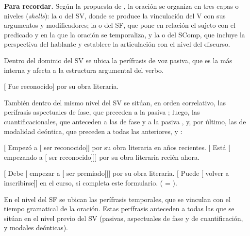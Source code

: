 \begin{destacado}
\textbf{Para recordar.} Según la propuesta de \textcite{rizzi1995}, la oración se
organiza en tres capas o niveles (\textit{shells}): la  o
del SV, donde se produce la vinculación del V con sus argumentos y
modificadores; la  o del SF, que pone en relación el
sujeto con el predicado y en la que la oración se temporaliza, y la
 o del SComp, que incluye la perspectiva del hablante y
establece la articulación con el nivel del discurso.
\end{destacado}

Dentro del dominio del SV se ubica la perífrasis de voz pasiva, que es la más interna y afecta a la estructura
argumental del verbo.

\begin{exe}
  \ex {}[ Fue reconocido] por su obra literaria.
\end{exe}

También dentro del mismo nivel del SV se sitúan, en orden correlativo, las
perífrasis aspectuales de fase, que preceden a la pasiva ;
luego, las cuantificacionales, que anteceden a las de fase y a la pasiva
, y, por último, las de modalidad deóntica, que preceden a
todas las anteriores,  y :

\begin{exe}
  \ex
    \begin{xlist}
      \ex\label{ex:11-asp-a} {}[ Empezó a [ ser reconocido]]
          por su obra literaria en años recientes.
      \ex\label{ex:11-asp-b} {}[ Está [ empezando a
          [ ser reconocido]]] por su obra literaria recién ahora.
    \end{xlist}
  \ex
    \begin{xlist}
      \ex\label{ex:11-deont-a} {}[ Debe [ empezar a
          [ ser premiado]]] por su obra literaria.
      \ex\label{ex:11-deont-b} {}[ Puede [ volver a
          inscribirse]] en el curso, si completa este formulario.
          ( = ).
    \end{xlist}
\end{exe}

En el nivel del SF se ubican las perífrasis temporales, que se vinculan con el
tiempo gramatical de la oración. Estas perífrasis anteceden a todas las que se
sitúan en el nivel previo del SV (pasivas, aspectuales de fase y de
cuantificación, y modales deónticas).

